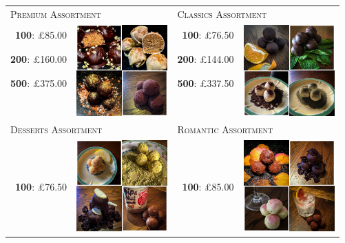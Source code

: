 \documentclass[11pt, english]{article}
\begin{document}
	\begin{table}[h]
	\begin{center}
	\begin{tabular}{r|p{4cm}r|p{4cm}}
		\multicolumn{2}{l}{\textsc{Premium Assortment}} & \multicolumn{2}{l}{\textsc{Classics Assortment}}\\
		\textbf{100}: \pounds85.00 & \multirow{8}{*}{\includegraphics[width=3.5cm,height=3.5cm]{../Photos_Shop/Premium.png}} & \textbf{100}: \pounds76.50 & \multirow{8}{*}{\includegraphics[width=3.5cm,height=3.5cm]{../Photos_Shop/Classics.png}}\\
		\textbf{200}: \pounds160.00 & & \textbf{200}: \pounds144.00 & \\
		\textbf{500}: \pounds375.00 & & \textbf{500}: \pounds337.50 & \\
		\multicolumn{4}{l}{}\\
		\multicolumn{4}{l}{}\\
		\multicolumn{4}{l}{}\\
		\multicolumn{4}{l}{}\\
		\multicolumn{4}{l}{}\\
		\multicolumn{2}{l}{\textsc{Desserts Assortment}} & \multicolumn{2}{l}{\textsc{Romantic Assortment}}\\
		\textbf{100}: \pounds76.50 & \multirow{5}{*}{\includegraphics[width=3.5cm,height=3.5cm]{../Photos_Shop/Desserts.png}} & \textbf{100}: \pounds85.00 & \multirow{5}{*}{\includegraphics[width=3.5cm,height=3.5cm]{../Photos_Shop/Romantic.png}}\\

\end{tabular}
\end{center}
\end{table}
\end{document}
